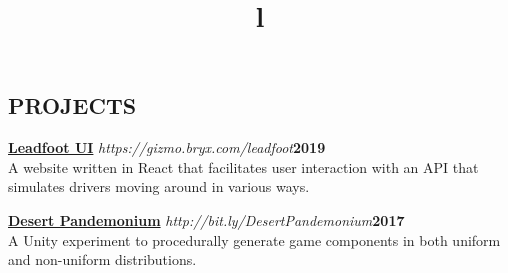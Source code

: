\documentclass[line,margin]{res}
\begin{document}
\begin{resume}
\section{PROJECTS}
\par
    \href{https://gizmo.bryx.com/leadfoot}{\textbf{Leadfoot UI}}
    {\sl https://gizmo.bryx.com/leadfoot}\hfill \textbf{2019}\\ 
    A website written in React that facilitates user interaction with an API that simulates drivers moving around in various ways.
	
	\par
    \href{https://github.com/MaeveMonster/DesertPandemonium}{\textbf{Desert Pandemonium}}
    {\sl http://bit.ly/DesertPandemonium}\hfill \textbf{2017}\\ 
    A Unity experiment to procedurally generate game components in both uniform and non-uniform distributions.


\begin{format}
\title{l}\\
\\
\body\\
\end{format}

\end{resume}
\end{document}
